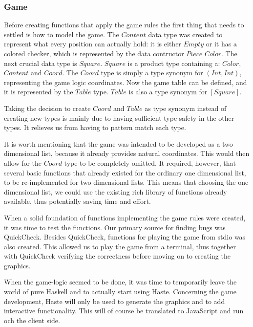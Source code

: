 \documentclass[a4paper]{article}
\begin{document}
\subsubsection{Game}
Before creating functions that apply the game rules the first thing that needs to settled is how to model the game. The $Content$ data type was created to represent what every position can actually hold: it is either $Empty$ or it has a colored checker, which is represented by the data contructor $Piece$ $Color$. The next crucial data type is $Square$. $Square$ is a product type containing a: $Color$, $Content$ and $Coord$. The $Coord$ type is simply a type synonym for $(Int,Int)$, representing the game logic coordinates. Now the game table can be defined, and it is represented by the $Table$ type. $Table$ is also a type synonym for $[Square]$. 

Taking the decision to create $Coord$ and $Table$ as type synonym instead of creating new types is mainly due to having sufficient type safety in the other types. It relieves us from having to pattern match each type.

It is worth mentioning that the game was intended to be developed as a two dimensional list, because it already provides natural coordinates. This would then allow for the $Coord$ type to be completely omitted. It required, however, that several basic functions that already existed for the ordinary one dimensional list, to be re-implemented for two dimensional lists. This means that choosing the one dimensional list, we could use the existing rich library of functions already available, thus potentially saving time and effort. 

When a solid foundation of functions implementing the game rules were created, it was time to test the functions. Our primary source for finding bugs was QuickCheck. Besides QuickCheck, functions for playing the game from stdio was also created. This allowed us to play the game from a terminal, thus together with QuickCheck verifying the correctness before moving on to creating the graphics. 

When the game-logic seemed to be done, it was time to temporarily leave the world of pure Haskell and to actually start using Haste. Concerning the game development, Haste will only be used to generate the graphics and to add interactive functionality. This will of course be translated to JavaScript and run och the client side. 
\end{document}
